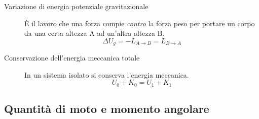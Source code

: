 \documentclass[a4paper,11pt,italian]{article}
\begin{document}
\begin{description}
  \item[Variazione di energia potenziale gravitazionale] 
  È il lavoro che una forza compie \emph{contro} la forza peso per portare un corpo da una certa altezza A ad un'altra altezza B. 
  \[ \Delta U_g = -L_{A\rightarrow B} = L_{B\rightarrow A} \]


  \item[Conservazione dell'energia meccanica totale] 
  In un sistema isolato si conserva l'energia meccanica. 
  \[ U_0 + K_0 = U_1 + K_1 \]
\end{description}



\subsection{Quantità di moto e momento angolare}
\end{document}
